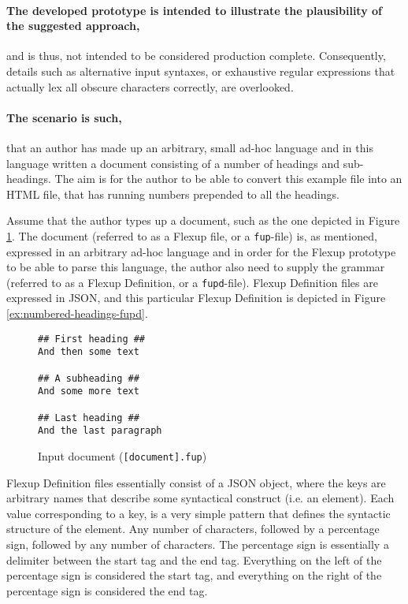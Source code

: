 \documentclass{scrreprt}
\begin{document}
\paragraph{The developed prototype is intended to illustrate the plausibility of the suggested approach, } and is thus, not intended to be considered production complete. Consequently, details such as alternative input syntaxes, or exhaustive regular expressions that actually lex all obscure characters correctly, are overlooked.


\paragraph{The scenario is such,} that an author has made up an arbitrary, small ad-hoc language and in this language written a document consisting of a number of headings and sub-headings. The aim is for the author to be able to convert this example file into an HTML file, that has running numbers prepended to all the headings.

Assume that the author types up a document, such as the one depicted in Figure \ref{ex:numbered-headings-input}. The document (referred to as a Flexup file, or a \texttt{fup}-file) is, as mentioned, expressed in an arbitrary ad-hoc language and in order for the Flexup prototype to be able to parse this language, the author also need to supply the grammar (referred to as a Flexup Definition, or a \texttt{fupd}-file). Flexup Definition files are expressed in JSON, and this particular Flexup Definition is depicted in Figure \ref{ex:numbered-headings-fupd}.

\begin{figure}[h]
\begin{lstlisting}
## First heading ##
And then some text

## A subheading ##
And some more text

## Last heading ##
And the last paragraph
\end{lstlisting}
\caption{Input document (\texttt{[document].fup})}
\label{ex:numbered-headings-input}
\end{figure}

Flexup Definition files essentially consist of a JSON object, where the keys are arbitrary names that describe some syntactical construct (i.e. an element). Each value corresponding to a key, is a very simple pattern that defines the syntactic structure of the element. Any number of characters, followed by a percentage sign, followed by any number of characters. The percentage sign is essentially a delimiter between the start tag and the end tag. Everything on the left of the percentage sign is considered the start tag, and everything on the right of the percentage sign is considered the end tag.
\end{document}
